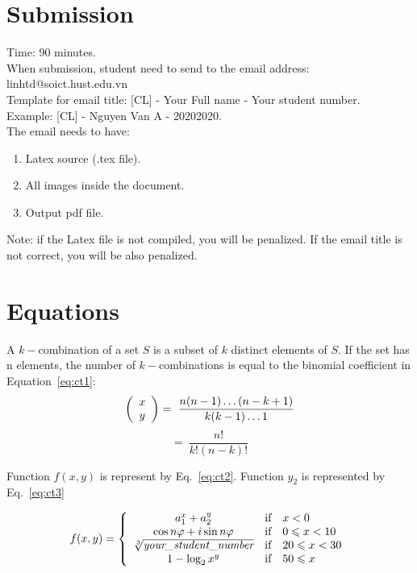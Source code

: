 \documentclass{article}
\begin{document}
\section{Submission}
Time: 90 minutes.\\
When submission, student need to send to the email address: linhtd@soict.hust.edu.vn\\
Template for email title: [CL] - Your Full name - Your student number.\\
Example: [CL] - Nguyen Van A - 20202020.\\
The email needs to have:
\begin{enumerate}
    \item Latex source (.tex file).
    \item All images inside the document.
    \item Output pdf file.
\end{enumerate}
Note: if the Latex file is not compiled, you will be penalized. If the email title is not correct, you will be also penalized.
\section{Equations}
A $k-$combination of a set $S$ is a subset of $k$ distinct elements of $S$. If the set has n elements, the number of $k-$combinations is equal to the binomial coefficient in Equation~\ref{eq:ct1}:
\begin{displaymath}
\left(
\begin{array}{c}
    x \\
    y  
\end{array}
\right)
= \  \frac{n(n-1)\ldots (n-k+1)}{k(k-1)\ldots 1}\\
\end{displaymath}
\begin{equation}
    \label{eq:ct1}
    = \ \frac{n!}{k!(n-k)!}
\end{equation}
\centerline{Function $f(x,y)$ is represent by Eq.~\ref{eq:ct2}. Function $y_2$ is represented by Eq.~\ref{eq:ct3}}
\begin{equation}
    \label{eq:ct2}
    f(x,y) = \left\{
    \begin{array}{ccl}
        a_1^x + a_2^y & \textrm{if} & x<0  \\
        \cos n\varphi + i\sin n\varphi & \textrm{if} & 0\leqslant x<10 \\
        \sqrt[3]{\emph{your\textunderscore student\textunderscore number}} & \textrm{if} & 20\leqslant x< 30\\
        1 - \log_2{x^y} & \textrm{if} & 50\leqslant x
    \end{array}
    \right .
\end{equation}
\end{document}
